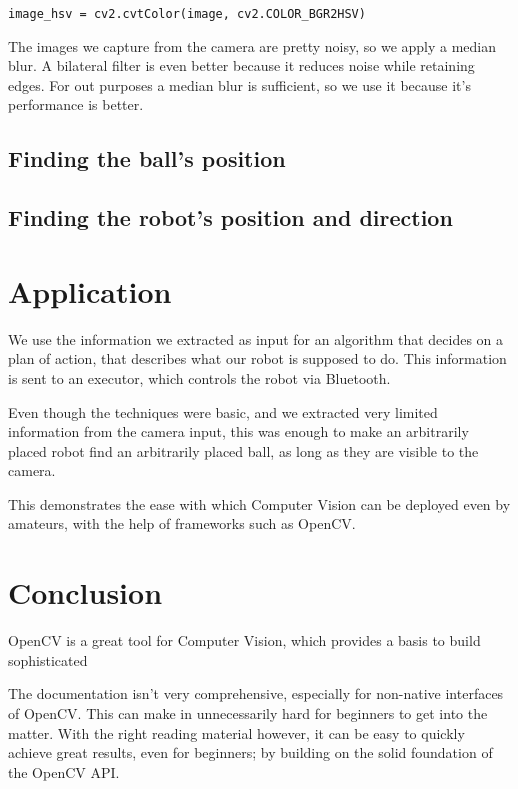 \documentclass[12pt, a4paper]{article}
\begin{document}
\begin{lstlisting}
image_hsv = cv2.cvtColor(image, cv2.COLOR_BGR2HSV)
\end{lstlisting}

The images we capture from the camera are pretty noisy, so we apply a median blur. A bilateral filter is even better because it reduces noise while retaining edges. For out purposes a median blur is sufficient, so we use it because it's performance is better. \cite{openCVImageSmoothing}

\subsection{Finding the ball's position}

\subsection{Finding the robot's position and direction}

\section{Application}
We use the information we extracted as input for an algorithm that decides on a plan of action, that describes what our robot is supposed to do. This information is sent to an executor, which controls the robot via Bluetooth.

Even though the techniques were basic, and we extracted very limited information from the camera input, this was enough to make an arbitrarily placed robot find an arbitrarily placed ball, as long as they are visible to the camera.

This demonstrates the ease with which Computer Vision can be deployed even by amateurs, with the help of frameworks such as OpenCV.

\section{Conclusion}
OpenCV is a great tool for Computer Vision, which provides a basis to build sophisticated

The documentation isn't very comprehensive, especially for non-native interfaces of OpenCV. This can make in unnecessarily hard for beginners to get into the matter. With the right reading material however, it can be easy to quickly achieve great results, even for beginners; by building on the solid foundation of the OpenCV API.
\end{document}
